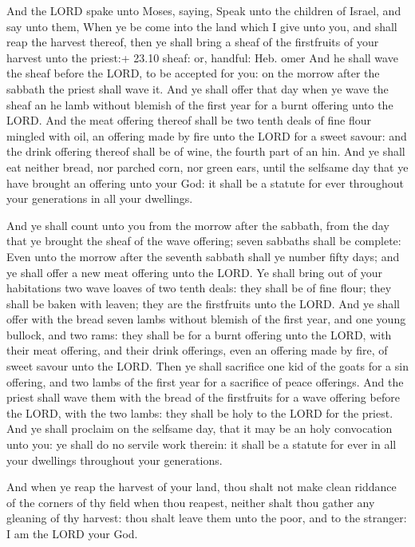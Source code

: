  And the LORD spake unto Moses, saying, 
Speak unto the children of Israel, and say unto them, When ye be come
into the land which I give unto you, and shall reap the harvest thereof,
then ye shall bring a sheaf of the firstfruits of your harvest unto the
priest:+ 23.10 sheaf: or, handful: Heb. omer  And he shall
wave the sheaf before the LORD, to be accepted for you: on the morrow
after the sabbath the priest shall wave it.  And ye shall
offer that day when ye wave the sheaf an he lamb without blemish of the
first year for a burnt offering unto the LORD.  And the
meat offering thereof shall be two tenth deals of fine flour mingled
with oil, an offering made by fire unto the LORD for a sweet savour: and
the drink offering thereof shall be of wine, the fourth part of an hin.
 And ye shall eat neither bread, nor parched corn, nor
green ears, until the selfsame day that ye have brought an offering unto
your God: it shall be a statute for ever throughout your generations in
all your dwellings.

 And ye shall count unto you from the morrow after the
sabbath, from the day that ye brought the sheaf of the wave offering;
seven sabbaths shall be complete:  Even unto the morrow
after the seventh sabbath shall ye number fifty days; and ye shall offer
a new meat offering unto the LORD.  Ye shall bring out of
your habitations two wave loaves of two tenth deals: they shall be of
fine flour; they shall be baken with leaven; they are the firstfruits
unto the LORD.  And ye shall offer with the bread seven
lambs without blemish of the first year, and one young bullock, and two
rams: they shall be for a burnt offering unto the LORD, with their meat
offering, and their drink offerings, even an offering made by fire, of
sweet savour unto the LORD.  Then ye shall sacrifice one
kid of the goats for a sin offering, and two lambs of the first year for
a sacrifice of peace offerings.  And the priest shall wave
them with the bread of the firstfruits for a wave offering before the
LORD, with the two lambs: they shall be holy to the LORD for the priest.
 And ye shall proclaim on the selfsame day, that it may be
an holy convocation unto you: ye shall do no servile work therein: it
shall be a statute for ever in all your dwellings throughout your
generations.

 And when ye reap the harvest of your land, thou shalt
not make clean riddance of the corners of thy field when thou reapest,
neither shalt thou gather any gleaning of thy harvest: thou shalt leave
them unto the poor, and to the stranger: I am the LORD your God.

